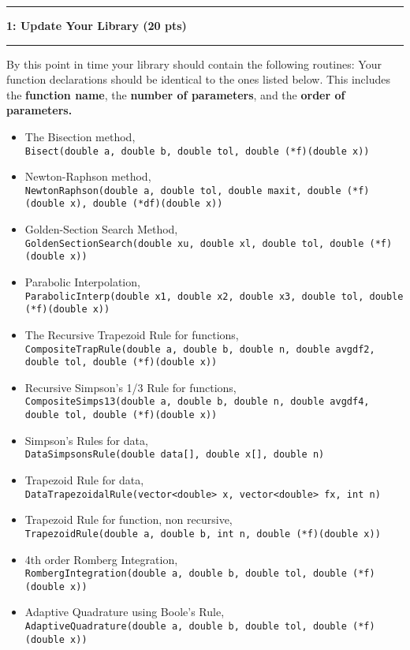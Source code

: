 \documentclass[11pt]{article}
\newcommand\question[2]{\vspace{.25in}\hrule\textbf{#1: #2}\vspace{.5em}\hrule\vspace{.10in}}
\begin{document}
\raggedright
\newcommand\Page{\page  / \lastPage}
\newcommand\page{1}
\newcommand\qN[2]{\Large {#1} \small{#2} \normalsize}

\newcommand\dueDate{\today}
\newcommand\hwnum{6}
\newcommand\ExNum{}

\newcommand\lastPage{3}

\lhead{\large Homework \hwnum }
\rhead{\rightHead}
\newcommand\rightHead{\large Due Oct 23, 2020}

\question{1}{Update Your Library  (20 pts)}
By this point in time your library should contain the following routines:
Your function declarations should be identical to the ones listed below. This includes the \textbf{function name}, the \textbf{number of parameters}, and the\textbf{ order of parameters.} 
\begin{itemize}
	\item The Bisection method, \\\texttt{Bisect(double a, double b, double tol, double (*f)(double x))}
	\item Newton-Raphson method, \\\texttt{NewtonRaphson(double a, double tol, double maxit, double (*f)(double x), double (*df)(double x))}
	\item Golden-Section Search Method, \\\texttt{GoldenSectionSearch(double xu, double xl, double tol, double (*f)(double x))}
	\item Parabolic Interpolation, \\\texttt{ParabolicInterp(double x1, double x2, double x3, double tol, double (*f)(double x))}
	\item The Recursive Trapezoid Rule for functions, \\\texttt{CompositeTrapRule(double a, double b, double n, double avgdf2, double tol, double (*f)(double x))}
	\item Recursive Simpson's 1/3 Rule for functions, \\\texttt{CompositeSimps13(double a, double b, double n, double avgdf4, double tol, double (*f)(double x))}
	\item Simpson's Rules for data, \\\texttt{DataSimpsonsRule(double data[], double x[], double n)}
	\item Trapezoid Rule for data, \\\texttt{DataTrapezoidalRule(vector<double> x, vector<double> fx, int n)}
	\item Trapezoid Rule for function, non recursive, \\\texttt{TrapezoidRule(double a, double b, int n, double (*f)(double x))}
	\item 4th order Romberg Integration, \\\texttt{RombergIntegration(double a, double b, double tol, double (*f)(double x))}
	\item Adaptive Quadrature using Boole's Rule, \\\texttt{AdaptiveQuadrature(double a, double b, double tol, double (*f)(double x))}
\end{itemize}
\end{document}

